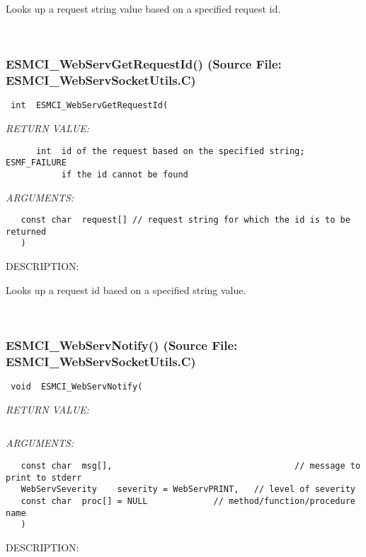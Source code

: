       Looks up a request string value based on a specified request id.
   
 
\mbox{}\hrulefill\
 
\subsubsection{ESMCI\_WebServGetRequestId() (Source File: ESMCI\_WebServSocketUtils.C)}


  
\begin{verbatim} int  ESMCI_WebServGetRequestId(\end{verbatim}{\em RETURN VALUE:}
\begin{verbatim}      int  id of the request based on the specified string; ESMF_FAILURE
           if the id cannot be found\end{verbatim}{\em ARGUMENTS:}
\begin{verbatim}   const char  request[] // request string for which the id is to be returned
   )\end{verbatim}
{\sf DESCRIPTION:\\ }


      Looks up a request id based on a specified string value.
   
 
\mbox{}\hrulefill\
 
\subsubsection{ESMCI\_WebServNotify() (Source File: ESMCI\_WebServSocketUtils.C)}


  
\begin{verbatim} void  ESMCI_WebServNotify(\end{verbatim}{\em RETURN VALUE:}
\begin{verbatim} \end{verbatim}{\em ARGUMENTS:}
\begin{verbatim}   const char  msg[],                                    // message to print to stderr
   WebServSeverity    severity = WebServPRINT,   // level of severity
   const char  proc[] = NULL             // method/function/procedure name
   )\end{verbatim}
{\sf DESCRIPTION:\\ }


